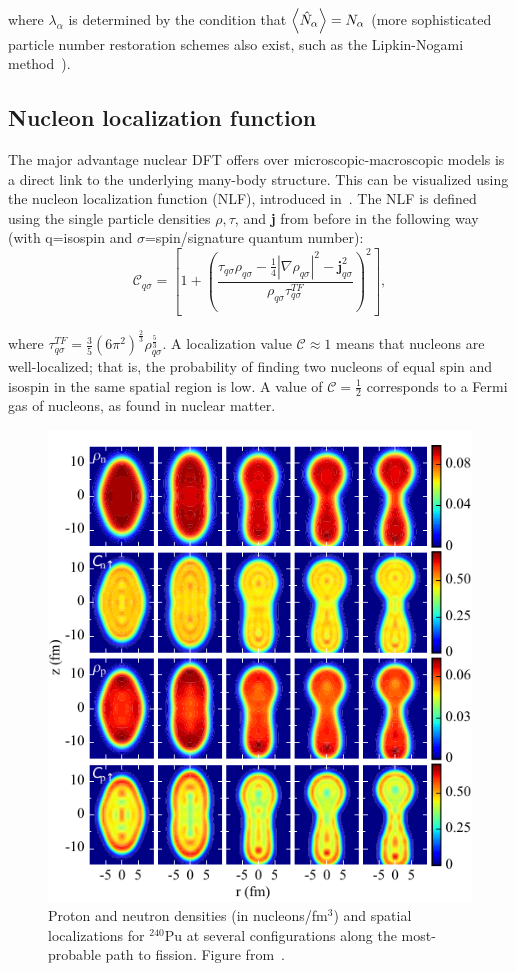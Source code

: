 \noindent where $\lambda_\alpha$ is determined by the condition that $\expval{\hat{N}_\alpha} = N_\alpha$ (more sophisticated particle number restoration schemes also exist, such as the Lipkin-Nogami method~\cite{Lipkin1960, Nogami1964, Pradhan1973, Flocard1997}). %

\subsection{Nucleon localization function}\label{sect:locali}
The major advantage nuclear DFT offers over microscopic-macroscopic models is a direct link to the underlying many-body structure. This can be visualized using the nucleon localization function (NLF), introduced in~\cite{Reinhard2011,Zhang2016}. The NLF is defined using the single particle densities $\rho, \tau$, and \textbf{j} from before in the following way (with q=isospin and $\sigma$=spin/signature quantum number):
\begin{equation}
\mathcal{C}_{q\sigma} = \left[1+\left(\frac{\tau_{q\sigma}\rho_{q\sigma}-\frac{1}{4}|\nabla\rho_{q\sigma}|^2-\mathbf{j}^2_{q\sigma}}{\rho_{q\sigma}\tau_{q\sigma}^{TF}}\right)^2\right],
\end{equation}

\noindent where $\tau_{q\sigma}^{TF}=\frac{3}{5}(6\pi^2)^\frac{2}{3}\rho_{q\sigma}^\frac{5}{3}$. A localization value $\mathcal{C} \approx 1$ means that nucleons are well-localized; that is, the probability of finding two nucleons of equal spin and isospin in the same spatial region is low. A value of $\mathcal{C}=\frac{1}{2}$ corresponds to a Fermi gas of nucleons, as found in nuclear matter.

\begin{figure}
	\centering
	\includegraphics[width=0.5\linewidth]{TeX_files/methods_locali}
	\caption[Proton and neutron densities (in nucleons/fm$^3$) and spatial localizations for $^{240}$Pu at several configurations along the most-probable path to fission.]{Proton and neutron densities (in nucleons/fm$^3$) and spatial localizations for $^{240}$Pu at several configurations along the most-probable path to fission. Figure from~\cite{Zhang2016}.}
	\label{fig:methodslocali}
\end{figure}

